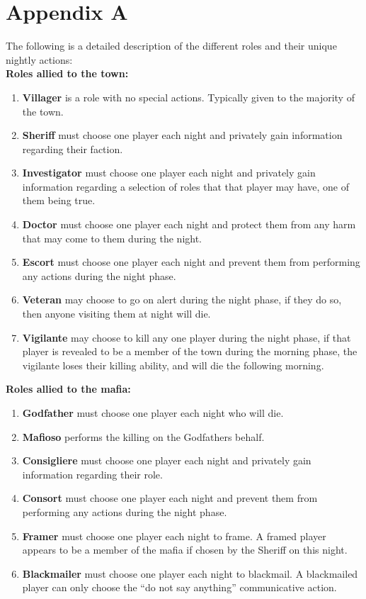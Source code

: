\section{Appendix A}
The following is a detailed description of the different roles and their unique nightly actions: \\
\textbf{Roles allied to the town:} 
\begin{enumerate}
	\item\textbf{Villager} is a  role with no special actions. Typically given to the majority of the town. 
	\item\textbf{Sheriff} must choose one player each night and privately gain information regarding their faction. 
	\item\textbf{Investigator} must choose one player each night and privately gain information regarding a selection of roles that that player may have, one of them being true.
	\item\textbf{Doctor} must choose one player each night and protect them from any harm that may come to them during the night. 
	\item\textbf{Escort} must choose one player each night and prevent them from performing any actions during the night phase.
	\item\textbf{Veteran} may choose to go on alert during the night phase, if they do so, then anyone visiting them at night will die. 
	\item\textbf{Vigilante} may choose to kill any one player during the night phase, if that player is revealed to be a member of the town during the morning phase, the vigilante loses their killing ability, and will die the following morning.
\end{enumerate}
\textbf{Roles allied to the mafia:} 
\begin{enumerate}
	\item\textbf{Godfather} must choose one player each night who will die.
	\item\textbf{Mafioso} performs the killing on the Godfathers behalf.
	\item\textbf{Consigliere} must choose one player each night and privately gain information regarding their role. 
	\item\textbf{Consort} must choose one player each night and prevent them from performing any actions during the night phase.
	\item\textbf{Framer} must choose one player each night to frame. A framed player appears to be a member of the mafia if chosen by the Sheriff on this night.
	\item\textbf{Blackmailer} must choose one player each night to blackmail. A blackmailed player can only choose the “do not say anything” communicative action. 
\end{enumerate}